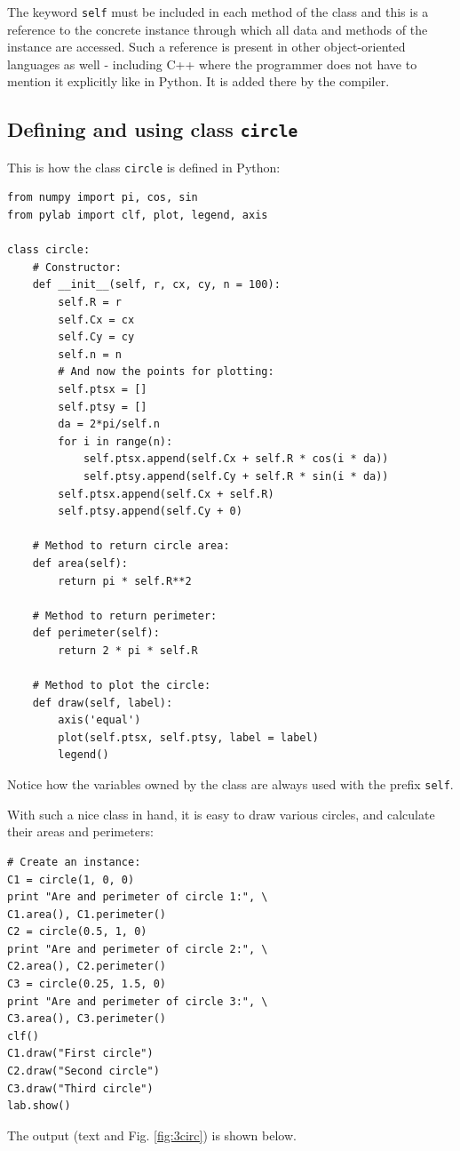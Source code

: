 The keyword {\tt self} must be included in each method of the class 
and this is a reference to the concrete instance through which all
data and methods of the instance are accessed. Such a reference is present 
in other object-oriented languages as well - including C++ where the programmer
does not have to mention it explicitly like in Python. It is added there by 
the compiler.

\subsection{Defining and using class {\tt circle}} \label{subsec:circle}

This is how the class {\tt circle} is defined in Python:

\begin{verbatim}
from numpy import pi, cos, sin
from pylab import clf, plot, legend, axis

class circle:
    # Constructor:
    def __init__(self, r, cx, cy, n = 100):
        self.R = r
        self.Cx = cx
        self.Cy = cy
        self.n = n
        # And now the points for plotting:
        self.ptsx = []
        self.ptsy = []
        da = 2*pi/self.n
        for i in range(n):
            self.ptsx.append(self.Cx + self.R * cos(i * da))
            self.ptsy.append(self.Cy + self.R * sin(i * da))
        self.ptsx.append(self.Cx + self.R)
        self.ptsy.append(self.Cy + 0)
            
    # Method to return circle area:
    def area(self):
        return pi * self.R**2
      
    # Method to return perimeter:
    def perimeter(self):
        return 2 * pi * self.R
      
    # Method to plot the circle:
    def draw(self, label):
        axis('equal')
        plot(self.ptsx, self.ptsy, label = label)
        legend()
\end{verbatim}
Notice how the variables owned by the class are always used with the 
prefix {\tt self}.

With such a nice class in hand, it is easy to draw various circles,
and calculate their areas and perimeters:
\begin{verbatim}        
# Create an instance:
C1 = circle(1, 0, 0)
print "Are and perimeter of circle 1:", \
C1.area(), C1.perimeter()
C2 = circle(0.5, 1, 0)
print "Are and perimeter of circle 2:", \
C2.area(), C2.perimeter()
C3 = circle(0.25, 1.5, 0)
print "Are and perimeter of circle 3:", \
C3.area(), C3.perimeter()
clf()
C1.draw("First circle")
C2.draw("Second circle")
C3.draw("Third circle")
lab.show()
\end{verbatim}
The output (text and Fig. \ref{fig:3circ}) is shown below.

